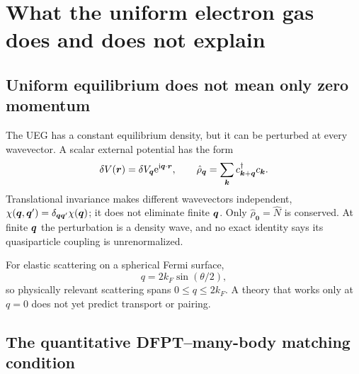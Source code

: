 \section{What the uniform electron gas does and does not explain}
\label{sec:ueg}

\subsection{Uniform equilibrium does not mean only zero momentum}

The UEG has a constant equilibrium density, but it can be perturbed at every
wavevector.  A scalar external potential has the form
\begin{equation}
  \delta V(\bm{r})=\delta V_{\bm{q}}\mathrm{e}^{\mathrm{i}\bm{q}\cdot\bm{r}},
  \qquad
  \hat\rho_{\bm{q}}=\sum_{\bm{k}}c^\dagger_{\bm{k}+\bm{q}}c_{\bm{k}}.
  \label{eq:rhoq}
\end{equation}
Translational invariance makes different wavevectors independent,
$\chi(\bm{q},\bm{q}')=\delta_{\bm{q}\bm{q}'}\chi(\bm{q})$; it does not eliminate finite
$\bm{q}$.  Only $\hat\rho_{\bm 0}=\hat N$ is conserved.  At finite $\bm{q}$ the
perturbation is a density wave, and no exact identity says its quasiparticle
coupling is unrenormalized.

For elastic scattering on a spherical Fermi surface,
\begin{equation}
  q=2k_F\sin(\theta/2),
  \label{eq:qangle}
\end{equation}
so physically relevant scattering spans $0\le q\le2k_F$.  A theory that works
only at $q=0$ does not yet predict transport or pairing.

\subsection{The quantitative DFPT--many-body matching condition}

